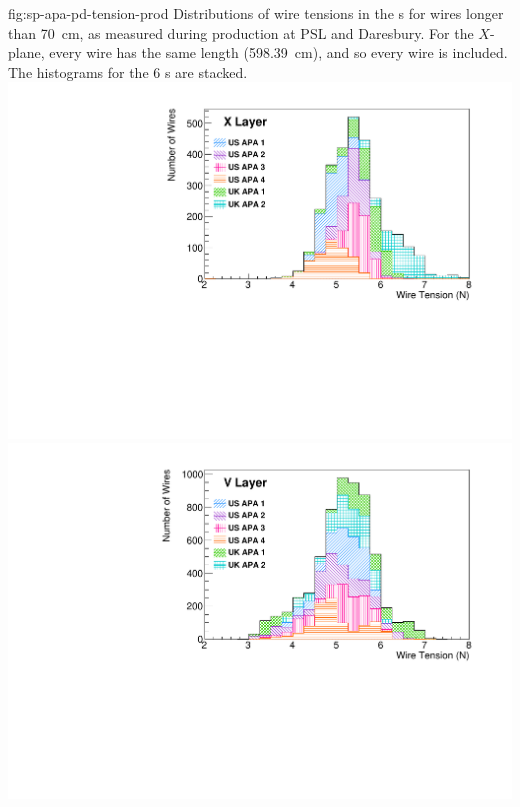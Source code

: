 \begin{dunefigure}{fig:sp-apa-pd-tension-prod}
{Distributions of wire tensions in the  s for wires longer than \SI{70}{cm}, as measured during production at PSL and Daresbury. For the $X$-plane, every wire has the same length (\SI{598.39}{cm}), and so every wire is included. %
The histograms for the 6 s are stacked. %
}
\includegraphics[height=0.28\textheight,trim=0mm 0mm 0mm 0mm,clip]{graphics/sp-apa-X-layer-tensions.pdf}
\includegraphics[height=0.28\textheight,trim=0mm 0mm 0mm 0mm,clip]{graphics/sp-apa-V-layer-tensions.pdf}

\end{dunefigure}
